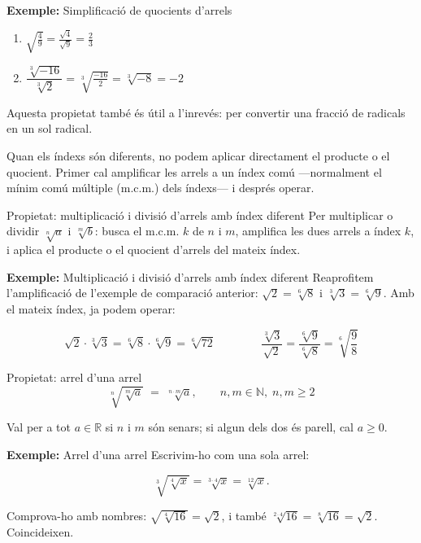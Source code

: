 \begin{exemple}{\textbf{Exemple:} Simplificació de quocients d'arrels}
\begin{enumerate}
\item $\sqrt{\tfrac{4}{9}} = \tfrac{\sqrt{4}}{\sqrt{9}} = \tfrac{2}{3}$
\item $\dfrac{\sqrt[3]{-16}}{\sqrt[3]{2}} = \sqrt[3]{\tfrac{-16}{2}} = \sqrt[3]{-8} = -2$
\end{enumerate}

Aquesta propietat també és útil a l'inrevés: per convertir una fracció de radicals en un sol radical.
\end{exemple}

Quan els índexs són diferents, no podem aplicar directament el producte o el quocient. Primer cal amplificar les arrels a un índex comú —normalment el mínim comú múltiple (m.c.m.) dels índexs— i després operar.

\begin{propietat}{Propietat: multiplicació i divisió d'arrels amb índex diferent}
Per multiplicar o dividir $\sqrt[n]{a}$ i $\sqrt[m]{b}$: busca el m.c.m. $k$ de $n$ i $m$, amplifica les dues arrels a índex $k$, i aplica el producte o el quocient d'arrels del mateix índex.
\end{propietat}

\begin{exemple}{\textbf{Exemple:} Multiplicació i divisió d'arrels amb índex diferent}
Reaprofitem l'amplificació de l'exemple de comparació anterior: $\sqrt{2}=\sqrt[6]{8}$ i $\sqrt[3]{3}=\sqrt[6]{9}$. Amb el mateix índex, ja podem operar:

\[
\sqrt{2}\cdot\sqrt[3]{3} = \sqrt[6]{8}\cdot\sqrt[6]{9} = \sqrt[6]{72}
\qquad\qquad
\frac{\sqrt[3]{3}}{\sqrt{2}} = \frac{\sqrt[6]{9}}{\sqrt[6]{8}} = \sqrt[6]{\frac{9}{8}}
\]
\end{exemple}

\begin{propietat}{Propietat: arrel d'una arrel}
\[
\sqrt[n]{\sqrt[m]{a}} \;=\; \sqrt[n\cdot m]{a},
\qquad n,m \in \mathbb{N},\; n,m \ge 2
\]

Val per a tot $a \in \mathbb{R}$ si $n$ i $m$ són senars; si algun dels dos és parell, cal $a \geq 0$.
\end{propietat}

\begin{exemple}{\textbf{Exemple:} Arrel d'una arrel}
Escrivim-ho com una sola arrel:

\[
\sqrt[3]{\sqrt[4]{x}} = \sqrt[3\cdot 4]{x} = \sqrt[12]{x}.
\]

Comprova-ho amb nombres: $\sqrt{\sqrt[4]{16}} = \sqrt{2}$, i també $\sqrt[2\cdot 4]{16} = \sqrt[8]{16} = \sqrt{2}$. Coincideixen.
\end{exemple}

